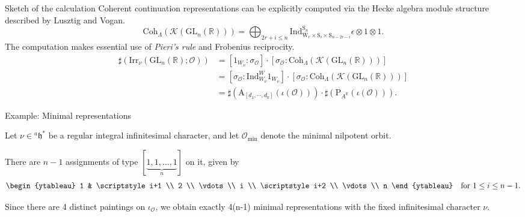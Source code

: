 \documentclass[fleqn,xcolor=dvipsnames]{beamer}
\newcommand{\BR}{{\mathbb {R}}}
\newcommand{\CK}{{\mathcal {K}}}
\newcommand{\CO}{{\mathcal {O}}}
\newcommand{\RA}{{\mathrm {A}}}
\newcommand{\GL}{{\mathrm{GL}}}
\newcommand{\Ind}{{\mathrm{Ind}}}
\newcommand{\Irr}{{\mathrm{Irr}}}
\begin{document}
\begin{frame}{Sketch of the calculation}
  Coherent continuation representations can be explicitly computed via the Hecke algebra module structure described by Lusztig and Vogan.
  \begin{equation*}
    \mathrm{Coh}_{\Lambda}(\CK(\GL_{n}(\BR))) = \bigoplus_{2r + i \leq n} \Ind _{\mathrm{W}_{r} \times \mathrm{S}_{i} \times \mathrm{S}_{n-2r-i}}^{\mathrm{S}_{n}} \epsilon \otimes 1 \otimes 1.
  \end{equation*}
   The computation makes essential use of \alert{\emph{Pieri's rule}} and Frobenius reciprocity.
  \begin{align*}
    \sharp(\Irr_\nu(\GL_{n}(\BR);\CO)) &= [1_{W_\nu}:\sigma_{\CO}] \cdot [\sigma_{\CO}:\mathrm{Coh}_{\Lambda}(\CK(\GL_{n}(\BR)))]\\
    &= [\sigma_{\CO}:\Ind_{W_{\nu}}^{W}1_{W_{\nu}}] \cdot [\sigma_{\CO}:\mathrm{Coh}_{\Lambda}(\CK(\GL_{n}(\BR)))]\\
    & =  \sharp\left(\RA_{[d_1,\cdots,d_k]}(\iota(\CO))\right) \cdot \sharp\left(\mathrm{P}_{A^{\BR}}(\iota(\CO))\right).
  \end{align*}
\end{frame}






\begin{frame}{Example: Minimal representations}

Let \( \nu \in {^a\mathfrak{h}}^* \) be a regular integral infinitesimal character, and let \( \mathcal{O}_{\mathrm{min}} \) denote the \alert{minimal nilpotent orbit}.

\medskip

There are \( n-1 \) assignments of type \( [\underbrace{1, 1, \dots, 1}_n] \) on it, given by
\[
\begin{ytableau}
    1 & \scriptstyle i+1 \\
    2 \\
    \vdots \\
    i \\
    \scriptstyle i+2 \\
    \vdots \\
    n
\end{ytableau}
\quad \text{for } 1 \leq i \leq n-1.
\]

\medskip

 Since there are 4 distinct paintings on $\iota_{\CO}$, we obtain exactly \alert{4(n-1) minimal representations}   with the fixed infinitesimal character \( \nu \).

\end{frame}
\end{document}
